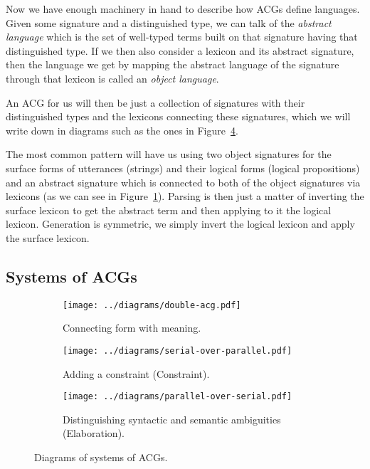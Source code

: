 \documentclass{llncs}
\begin{document}
Now we have enough machinery in hand to describe how ACGs define
languages. Given some signature and a distinguished type, we can talk of the
\emph{abstract language} which is the set of well-typed terms built on that
signature having that distinguished type. If we then also consider a lexicon
and its abstract signature, then the language we get by mapping the abstract
language of the signature through that lexicon is called an \emph{object
  language}.

An ACG for us will then be just a collection of signatures with their
distinguished types and the lexicons connecting these signatures, which we
will write down in diagrams such as the ones in Figure~\ref{fig:acg-comp}.

The most common pattern will have us using two object signatures for the
surface forms of utterances (strings) and their logical forms (logical
propositions) and an abstract signature which is connected to both of the
object signatures via lexicons (as we can see in
Figure~\ref{fig:acg-comp-basic}). Parsing is then just a matter of inverting
the surface lexicon to get the abstract term and then applying to it the
logical lexicon. Generation is symmetric, we simply invert the logical lexicon
and apply the surface lexicon.

\subsection{Systems of ACGs}

\begin{figure}[t]
  \centering
  \begin{subfigure}[b]{0.25\textwidth}
    \centering
    \texttt{[image: ../diagrams/double-acg.pdf]}
    \caption{\label{fig:acg-comp-basic} Connecting form with meaning.}
  \end{subfigure}
  \qquad
  \begin{subfigure}[b]{0.25\textwidth}
    \centering
    \texttt{[image: ../diagrams/serial-over-parallel.pdf]}
    \caption{\label{fig:acg-comp-constr} Adding a constraint (Constraint).}
  \end{subfigure}
  \qquad
  \begin{subfigure}[b]{0.25\textwidth}
    \centering
    \texttt{[image: ../diagrams/parallel-over-serial.pdf]}
    \caption{\label{fig:acg-comp-sem} Distinguishing syntactic and
      semantic ambiguities (Elaboration).}
  \end{subfigure}
  \caption{\label{fig:acg-comp} Diagrams of systems of ACGs.}
\end{figure}
\end{document}
